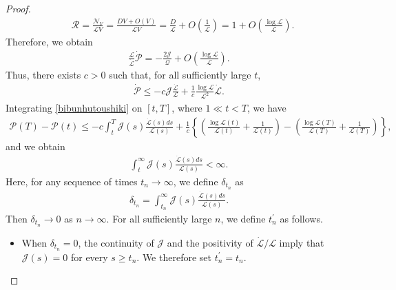 \documentclass[10pt,a4paper]{amsart}
\numberwithin{equation}{section}
\begin{document}
\begin{proof}
\begin{align*}
&\mathcal{R}=\frac{\mathcal{N}_V}{\mathcal{L}V}=\frac{DV+O(V)}{\mathcal{L}V}=\frac{D}{\mathcal{L}}+O\left(\frac{1}{\mathcal{L}}\right)=1+O\left(\frac{\log{\mathcal{L}}}{\mathcal{L}}\right).
\end{align*}
Therefore, we obtain
\begin{align*}
\frac{\mathcal{L}}{\dot{\mathcal{L}}}\dot{\mathcal{P}}=-\frac{2\mathcal{J}}{\mathcal{Q}}+O\left(\frac{\log{\mathcal{L}}}{\mathcal{L}}\right).
\end{align*}
Thus, there exists $c>0$ such that, for all sufficiently large $t$,
\begin{align}\label{bibunhutoushiki}
\dot{\mathcal{P}}\leq -c\mathcal{J}\frac{\dot{\mathcal{L}}}{\mathcal{L}}+\frac{1}{c}\frac{\log{\mathcal{L}}}{\mathcal{L}^2}\dot{\mathcal{L}}.
\end{align}
Integrating \eqref{bibunhutoushiki} on $[t,T]$, where $1\ll t<T$, we have
\begin{align*}
\mathcal{P}(T)-\mathcal{P}(t)\leq -c\int_t^T\mathcal{J}(s)\frac{\dot{\mathcal{L}}(s)ds}{\mathcal{L}(s)}+\frac{1}{c}\left\{\left(\frac{\log{\mathcal{L}(t)}}{\mathcal{L}(t)}+\frac{1}{\mathcal{L}(t)}\right)-\left(\frac{\log{\mathcal{L}(T)}}{\mathcal{L}(T)}+\frac{1}{\mathcal{L}(T)}\right)\right\},
\end{align*}
and we obtain
\begin{align*}
\int_t^{\infty}\mathcal{J}(s)\frac{\dot{\mathcal{L}}(s)ds}{\mathcal{L}(s)}<\infty.
\end{align*}
Here, for any sequence of times $t_n\to\infty$, we define $\delta_{t_n}$ as 
\begin{align*}
\delta_{t_n}=\int_{t_n}^{\infty}\mathcal{J}(s)\frac{\dot{\mathcal{L}}(s)ds}{\mathcal{L}(s)}.
\end{align*}
Then $\delta_{t_n}\to 0$ as $n\to\infty$. For all sufficiently large $n$, we define $t_n^{\prime}$ as follows.
\begin{itemize}
\item When $\delta_{t_n}=0$, the continuity of $\mathcal{J}$ and the positivity of $\dot{\mathcal{L}}/\mathcal{L}$ imply that $\mathcal{J}(s)=0$ for every $s\geq t_n$. We therefore set $t_n^{\prime}=t_n$.


\end{itemize}
\end{proof}
\end{document}
